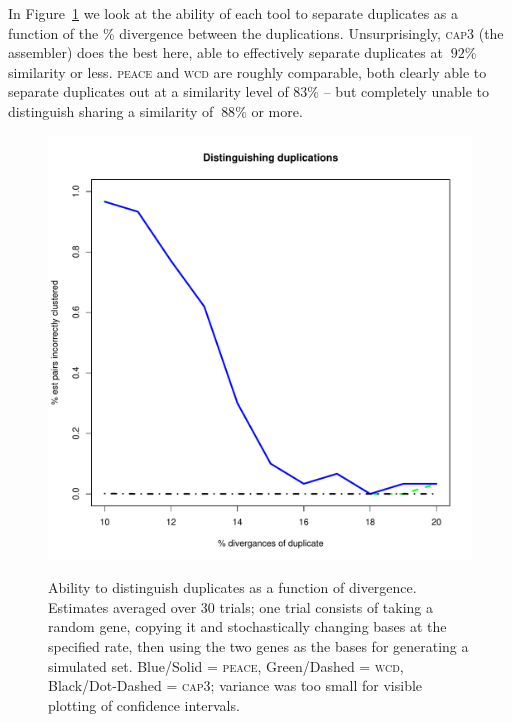 \documentclass[a4paper,12pt]{article}
\begin{document}
\begin{appendix}
In Figure~\ref{dups} we look at the ability of each tool to separate
duplicates as a function of the \% divergence between the
duplications.  Unsurprisingly, \textsc{cap3} (the assembler) does the best
here, able to effectively separate duplicates at $~92\%$ similarity
or less.  \textsc{peace} and \textsc{wcd} are roughly comparable, both clearly able to
separate duplicates out at a similarity level of $83\%$ -- but completely 
unable to distinguish sharing a similarity of $~88\%$ or more. 

\begin{figure}[tbp]
\centerline{
\label{dups}
\includegraphics[scale=0.35]{pics.d/duplicates_40.pdf}
}
\caption{Ability to distinguish duplicates as a function of
  divergence.  Estimates averaged over 30 trials; one trial consists
  of taking a random gene, copying it and stochastically changing bases
  at the specified rate, then using the two genes as the bases for
  generating a simulated set. Blue/Solid = \textsc{peace}, Green/Dashed = \textsc{wcd}, Black/Dot-Dashed = \textsc{cap3};
  variance was too small for visible plotting of
  confidence intervals.}
\end{figure}


\end{appendix}
\end{document}
